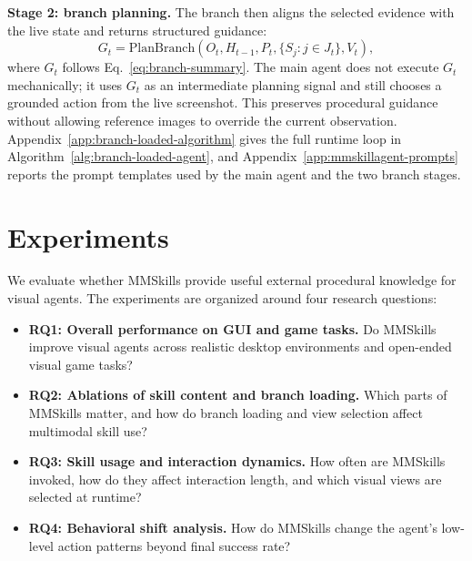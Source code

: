 \documentclass{llmxive}
\providecommand{\mmskillhl}{\cellcolor{mmskillrow}}
\begin{document}
\textbf{Stage 2: branch planning.} The branch then aligns the selected evidence with the live state and returns structured guidance:
\begin{equation}
    G_t=\text{PlanBranch}(O_t,H_{t-1},P_t,\{S_j:j\in J_t\},V_t),
    \label{eq:branch-stage2}
\end{equation}
where $G_t$ follows Eq.~\ref{eq:branch-summary}. The main agent does not execute $G_t$ mechanically; it uses $G_t$ as an intermediate planning signal and still chooses a grounded action from the live screenshot. This preserves procedural guidance without allowing reference images to override the current observation. Appendix~\ref{app:branch-loaded-algorithm} gives the full runtime loop in Algorithm~\ref{alg:branch-loaded-agent}, and Appendix~\ref{app:mmskillagent-prompts} reports the prompt templates used by the main agent and the two branch stages.


\section{Experiments}
\label{sec:experiments}

We evaluate whether MMSkills provide useful external procedural knowledge for visual agents. The experiments are organized around four research questions:



\begin{itemize}[leftmargin=*]
    \item \textbf{RQ1: Overall performance on GUI and game tasks.} Do MMSkills improve visual agents across realistic desktop environments and open-ended visual game tasks?
    \item \textbf{RQ2: Ablations of skill content and branch loading.} Which parts of MMSkills matter, and how do branch loading and view selection affect multimodal skill use?
    \item \textbf{RQ3: Skill usage and interaction dynamics.} How often are MMSkills invoked, how do they affect interaction length, and which visual views are selected at runtime?
    \item \textbf{RQ4: Behavioral shift analysis.} How do MMSkills change the agent's low-level action patterns beyond final success rate?
\end{itemize}

\renewcommand{\mmskillhl}{\cellcolor{mmskillrowpurple}}
\end{document}
